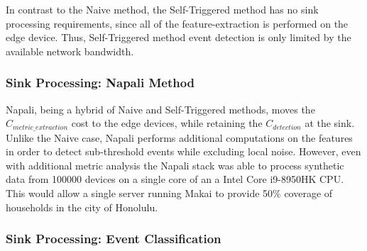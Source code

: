 In contrast to the Naive method, the Self-Triggered method has no sink processing requirements, since all of the feature-extraction is performed on the edge device.
Thus, Self-Triggered method event detection is only limited by the available network bandwidth.

\subsubsection{Sink Processing: Napali Method}

Napali, being a hybrid of Naive and Self-Triggered methods, moves the $C_{metric\_extraction}$ cost to the edge devices, while retaining
the $C_{detection}$ at the sink.
Unlike the Naive case, Napali performs additional computations on the features in order to detect sub-threshold events while excluding local noise.
However, even with additional metric analysis the Napali stack was able to process synthetic data from 100000 devices on a single core of an a Intel Core i9-8950HK CPU.
This would allow a single server running Makai to provide 50\% coverage of households in the city of Honolulu.

\subsubsection{Sink Processing: Event Classification}

